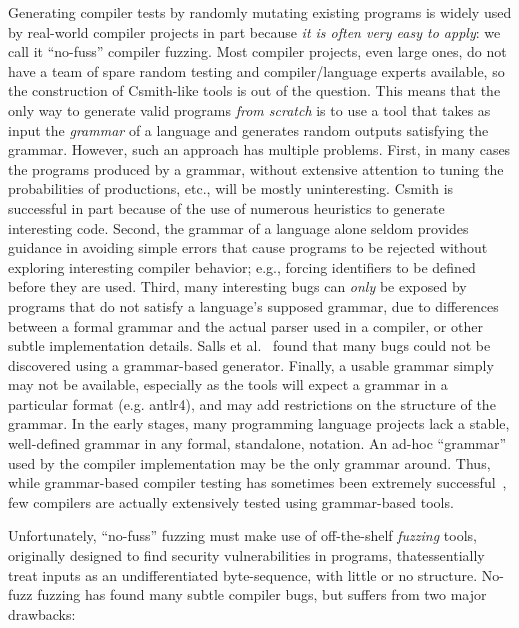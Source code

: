 \begin{sloppypar}
Generating compiler tests by randomly mutating existing programs is widely used by
real-world compiler projects in part because \emph{it is often very easy to
  apply}: we call it ``no-fuss'' compiler fuzzing.  Most compiler projects, even large ones, do not have a team
of spare random testing and compiler/language experts available, so the construction of
Csmith-like tools is out of the question.  This means that the only
way to generate valid programs \emph{from scratch} is to use a tool that takes as
input the \emph{grammar} of a language and generates random outputs
satisfying the grammar.   However, such an approach has multiple problems.
First, in many cases the programs produced by a grammar, without
extensive attention to tuning the probabilities of productions, etc., will be mostly uninteresting.
Csmith is successful in part because of the use of numerous heuristics
to generate interesting code.  Second, the grammar of a language alone
seldom provides guidance in avoiding simple errors that cause programs
to be rejected without exploring interesting compiler behavior; e.g., forcing identifiers to be
defined before they are used.  Third, many interesting bugs can \emph{only}
be exposed by programs that do not satisfy a language's supposed grammar, due to differences between a formal grammar and the actual
parser used in a compiler, or other subtle implementation details.
Salls et al.~\cite{Salls2021TokenLevel} found that many bugs could not be discovered using a
grammar-based generator.
Finally, a usable grammar simply may not be available, especially as the
tools will expect a grammar in a particular format (e.g. antlr4), and may add
restrictions on the structure of the grammar.  In the early stages,
many programming language projects lack a stable, well-defined
grammar in any formal, standalone, notation.  An ad-hoc ``grammar'' used by the compiler implementation may be the
only grammar around.  Thus, while grammar-based compiler
testing has sometimes been extremely successful~\cite{LangFuzz}, few compilers are actually
extensively tested using grammar-based tools.
\end{sloppypar}

Unfortunately, ``no-fuss''
fuzzing must make use of off-the-shelf \emph{fuzzing} tools,
originally designed to find security vulnerabilities in programs, thatessentially treat inputs as an
undifferentiated byte-sequence, with little or no structure.  No-fuzz
fuzzing has found many subtle compiler bugs, but
suffers from two major drawbacks:

